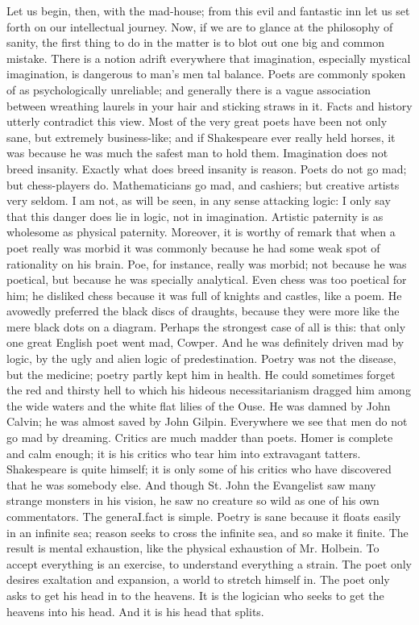 \documentclass{book}
\begin{document}
Let us begin, then, with the mad-house; from this evil and fantastic inn let us set forth on our intellectual journey. Now, if we are to glance at the philosophy of sanity, the first thing to do in the matter is to blot out one big and common mistake. There is a notion adrift everywhere that imagination, especially mystical imagination, is dangerous to man’s men tal balance. Poets are commonly spoken of as psychologically unreliable; and generally there is a vague association between wreathing laurels in your hair and sticking straws in it. Facts and history utterly contradict this view. Most of the very great poets have been not only sane, but extremely business-like; and if Shakespeare ever really held horses, it was because he was much the safest man to hold them. Imagination does not breed insanity. Exactly what does breed insanity is reason. Poets do not go mad; but chess-players do. Mathematicians go mad, and cashiers; but creative artists very seldom. I am not, as will be seen, in any sense attacking logic: I only say that this danger does lie in logic, not in imagination. Artistic paternity is as wholesome as physical paternity. Moreover, it is worthy of remark that when a poet really was morbid it was commonly because he had some weak spot of rationality on his brain. Poe, for instance, really was morbid; not because he was poetical, but because he was specially analytical. Even chess was too poetical for him; he disliked chess because it was full of knights and castles, like a poem. He avowedly preferred the black discs of draughts, because they were more like the mere black dots on a diagram. Perhaps the strongest case of all is this: that only one great English poet went mad, Cowper. And he was definitely driven mad by logic, by the ugly and alien logic of predestination. Poetry was not the disease, but the medicine; poetry partly kept him in health. He could sometimes forget the red and thirsty hell to which his hideous necessitarianism dragged him among the wide waters and the white flat lilies of the Ouse. He was damned by John Calvin; he was almost saved by John Gilpin. Everywhere we see that men do not go mad by dreaming. Critics are much madder than poets. Homer is complete and calm enough; it is his critics who tear him into extravagant tatters. Shakespeare is quite himself; it is only some of his critics who have discovered that he was somebody else. And though St. John the Evangelist saw many strange monsters in his vision, he saw no creature so wild as one of his own commentators. The generaI.fact is simple. Poetry is sane because it floats easily in an infinite sea; reason seeks to cross the infinite sea, and so make it finite. The result is mental exhaustion, like the physical exhaustion of Mr. Holbein. To accept everything is an exercise, to understand everything a strain. The poet only desires exaltation and expansion, a world to stretch himself in. The poet only asks to get his head in to the heavens. It is the logician who seeks to get the heavens into his head. And it is his head that splits.
\end{document}
